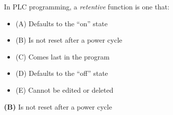 

In PLC programming, a {\it retentive} function is one that:

\begin{itemize}
\item{(A)} Defaults to the ``on'' state
\vskip 5pt 
\item{(B)} Is not reset after a power cycle
\vskip 5pt 
\item{(C)} Comes last in the program
\vskip 5pt 
\item{(D)} Defaults to the ``off'' state
\vskip 5pt 
\item{(E)} Cannot be edited or deleted
\end{itemize}







{\bf (B)} Is not reset after a power cycle
 










